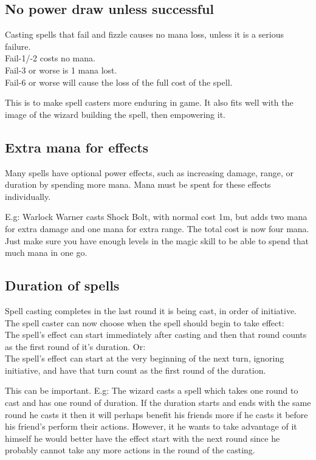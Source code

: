 \subsection*{No power draw unless successful}
Casting spells that fail and fizzle causes no mana loss, unless it is a serious failure.\\
Fail-1/-2 costs no mana. \\
Fail-3 or worse is 1 mana lost. \\
Fail-6 or worse will cause the loss of the full cost of the spell.

This is to make spell casters more enduring in game. It also fits well with the image of the wizard building the spell, then empowering it.


\subsection*{Extra mana for effects}
Many spells have optional power effects, such as increasing damage, range, or duration by spending more mana. Mana must be spent for these effects individually.

E.g: Warlock Warner casts Shock Bolt, with normal cost 1m, but adds two mana for extra damage and one mana for extra range. The total cost is now four mana.
Just make sure you have enough levels in the magic skill to be able to spend that much mana in one go.


\subsection*{Duration of spells}
Spell casting completes in the last round it is being cast, in order of initiative. The spell caster can now choose when the spell should begin to take effect: \\
The spell's effect can start immediately after casting and then that round counts as the first round of it's duration. Or: \\
The spell's effect can start at the very beginning of the next turn, ignoring initiative, and have that turn count as the first round of the duration.

This can be important. E.g: The wizard casts a spell which takes one round to cast and has one round of duration. If the duration starts and ends with the same round he casts it then it will perhaps benefit his friends more if he casts it before his friend's perform their actions. However, it he wants to take advantage of it himself he would better have the effect start with the next round since he probably cannot take any more actions in the round of the casting.

